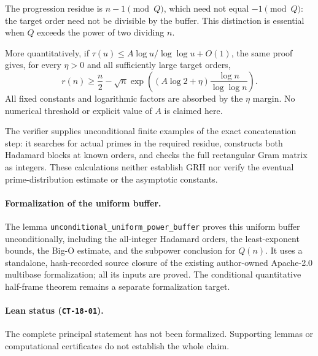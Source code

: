 The progression residue is $n-1\pmod Q$, which need not equal
$-1\pmod Q$: the target order need not be divisible by the buffer.
This distinction is essential when $Q$ exceeds the power of two
dividing $n$.

More quantitatively, if
$\tau(u)\le A\log u/\log\log u+O(1)$, the same proof gives,
for every $\eta>0$ and all sufficiently large target orders,
\[
 r(n)\ge\frac n2-
 \sqrt n\exp\!\left((A\log2+\eta)
                 \frac{\log n}{\log\log n}\right).
\]
All fixed constants and logarithmic factors are absorbed by the
$\eta$ margin. No numerical threshold or explicit value of $A$
is claimed here.

The verifier supplies unconditional finite examples of the exact
concatenation step: it searches for actual primes in the required
residue, constructs both Hadamard blocks at known orders, and checks
the full rectangular Gram matrix as integers. These calculations
neither establish GRH nor verify the eventual prime-distribution
estimate or the asymptotic constants.

\paragraph{Formalization of the uniform buffer.} The lemma \texttt{unconditional\_\allowbreak uniform\_\allowbreak power\_\allowbreak buffer} proves this uniform buffer unconditionally, including the all-integer Hadamard orders, the least-exponent bounds, the Big-O estimate, and the subpower conclusion for $Q(n)$. It uses a standalone, hash-recorded source closure of the existing author-owned Apache-2.0 multibase formalization; all its inputs are proved. The conditional quantitative half-frame theorem remains a separate formalization target.

\paragraph{Lean status (\texttt{CT-18-01}).} The complete principal statement has not been formalized. Supporting lemmas or computational certificates do not establish the whole claim.
